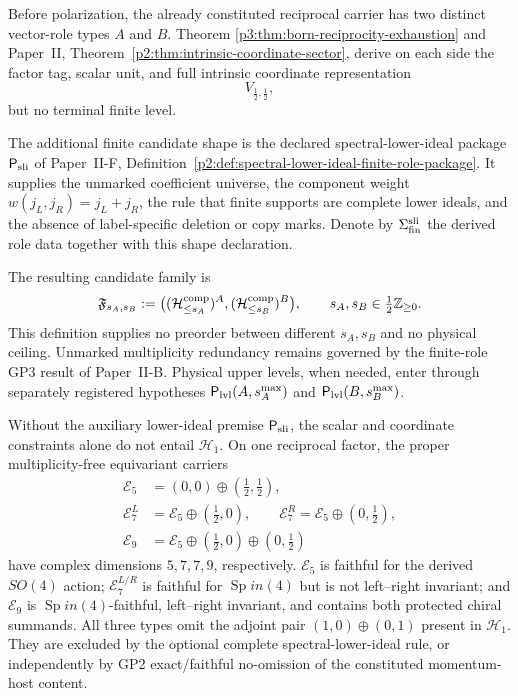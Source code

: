 \documentclass[11pt,a4paper]{article}
\begin{document}
\begin{definition}
\label{p3:def:seed-passivity}
Before polarization, the already constituted reciprocal carrier has two
distinct vector-role types \(A\) and \(B\).  Theorem
\ref{p3:thm:born-reciprocity-exhaustion} and Paper~II,
Theorem~\ref{p2:thm:intrinsic-coordinate-sector}, derive on each side the
factor tag, scalar unit, and full intrinsic coordinate representation
\[
 V_{\frac12,\frac12},
\]
but no terminal finite level.

The additional finite candidate shape is the declared spectral-lower-ideal
package \(\mathsf P_{\rm sli}\) of Paper~II-F,
Definition~\ref{p2:def:spectral-lower-ideal-finite-role-package}.  It supplies
the unmarked coefficient universe, the component weight
\(w(j_L,j_R)=j_L+j_R\), the rule that finite supports are complete lower
ideals, and the absence of label-specific deletion or copy marks.  Denote by
\(\Sigma_{\rm fin}^{\rm sli}\) the derived role data together with this
shape declaration.

The resulting candidate family is
\[
 \mathfrak F_{s_A,s_B}
 :=\bigl((\mathcal H_{\le s_A}^{\rm comp})^A,
         (\mathcal H_{\le s_B}^{\rm comp})^B\bigr),
 \qquad s_A,s_B\in\tfrac12\mathbb Z_{\ge0}.
\]
This definition supplies no preorder between different \(s_A,s_B\) and no
physical ceiling.  Unmarked multiplicity redundancy remains governed by the
finite-role GP3 result of Paper~II-B.  Physical upper levels, when needed,
enter through separately registered hypotheses
\(\mathsf P_{\rm lvl}(A,s_A^{\max})\) and
\(\mathsf P_{\rm lvl}(B,s_B^{\max})\).
\end{definition}

\begin{corollary}
\label{p3:cor:spectral-lower-ideal-sharpness}
Without the auxiliary lower-ideal premise \(\mathsf P_{\rm sli}\), the scalar and coordinate constraints alone do not entail \(\mathcal H_1\). On one reciprocal factor, the proper
multiplicity-free equivariant carriers
\[
\begin{aligned}
\mathcal E_5
&=(0,0)\oplus(\tfrac12,\tfrac12),\\
\mathcal E_7^L
&=\mathcal E_5\oplus(\tfrac12,0),
\qquad
\mathcal E_7^R
=\mathcal E_5\oplus(0,\tfrac12),\\
\mathcal E_9
&=\mathcal E_5\oplus(\tfrac12,0)\oplus(0,\tfrac12)
\end{aligned}
\]
have complex dimensions \(5,7,7,9\), respectively.
\(\mathcal E_5\) is faithful for the derived \(SO(4)\) action;
\(\mathcal E_7^{L/R}\) is faithful for \(\operatorname{Sp}in(4)\) but is not
left--right invariant; and \(\mathcal E_9\) is \(\operatorname{Sp}in(4)\)-faithful,
left--right invariant, and contains both protected chiral summands.  All
three types omit the adjoint pair \((1,0)\oplus(0,1)\) present in
\(\mathcal H_1\).  They are excluded by the optional complete spectral-lower-ideal rule, or independently by GP2 exact/faithful no-omission of the constituted momentum-host content.
\end{corollary}
\end{document}
